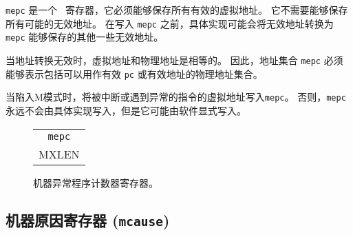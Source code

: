 {\tt mepc} 是一个 \warl\ 寄存器，它必须能够保存所有有效的虚拟地址。 
它不需要能够保存所有可能的无效地址。 
在写入 {\tt mepc} 之前，具体实现可能会将无效地址转换为 {\tt mepc} 能够保存的其他一些无效地址。

\iffalse
\begin{commentary}
When address translation is not in effect, virtual addresses and physical
addresses are equal.
Hence, the set of addresses {\tt mepc} must be able to represent includes the
set of physical addresses that can be used as a valid {\tt pc} or effective
address.
\end{commentary}
\fi
\begin{commentary}
当地址转换无效时，虚拟地址和物理地址是相等的。 
因此，地址集合 {\tt mepc} 必须能够表示包括可以用作有效 {\tt pc} 或有效地址的物理地址集合。
\end{commentary}

\iffalse
When a trap is taken into M-mode, {\tt mepc} is written with the
virtual address of the instruction that was interrupted or that
encountered the exception.  Otherwise, {\tt mepc} is never written by
the implementation, though it may be explicitly written by software.
\fi

当陷入M模式时，将被中断或遇到异常的指令的虚拟地址写入{\tt mepc}。 
否则，{\tt mepc}永远不会由具体实现写入，但是它可能由软件显式写入。

\begin{figure}[h!]
{\footnotesize
\begin{center}
\begin{tabular}{@{}J}
 \\
\hline
{} \\
\hline
MXLEN \\
\end{tabular}
\end{center}
}
\vspace{-0.1in}
\caption{机器异常程序计数器寄存器。}
\label{mepcreg}
\end{figure}

\subsection{机器原因寄存器 ({\tt mcause})}
\label{sec:mcause}

